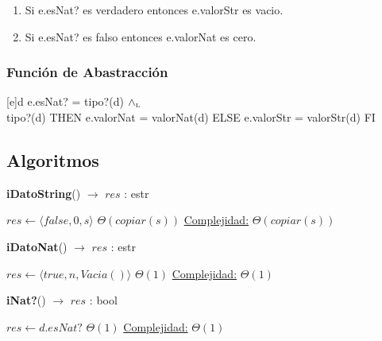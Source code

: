 \begin{enumerate}
	\item Si e.esNat? es verdadero entonces e.valorStr es vacio.
	\item Si e.esNat? es falso entonces e.valorNat es cero.

\end{enumerate}

\mbox{}


\subsubsection{Función de Abastracción}

[e]{d}{
	e.esNat? = tipo?(d) $\land_{\mathrm{\scriptscriptstyle{L}}}$ \\
	\IF tipo?(d) THEN e.valorNat = valorNat(d) ELSE e.valorStr = valorStr(d) FI
}


\subsection{Algoritmos}

  
\begin{algorithm}[H]{\textbf{iDatoString}() $\to$ $res$ : estr}
    	\begin{algorithmic}[1]
			 \State $res \gets \langle false, 0, s \rangle$ \Comment $\Theta(copiar(s))$
			\medskip
			\Statex \underline{Complejidad:} $\Theta(copiar(s))$
    	\end{algorithmic}
\end{algorithm}


  
\begin{algorithm}[H]{\textbf{iDatoNat}() $\to$ $res$ : estr}
    	\begin{algorithmic}[1]
			 \State $res \gets \langle true, n, Vacia() \rangle$ \Comment $\Theta(1)$
			\medskip
			\Statex \underline{Complejidad:} $\Theta(1)$
    	\end{algorithmic}
\end{algorithm}


\begin{algorithm}[H]{\textbf{iNat?}() $\to$ $res$ : bool}
    	\begin{algorithmic}[1]
			 \State $res \gets d.esNat? $ \Comment $\Theta(1)$
			\medskip
			\Statex \underline{Complejidad:} $\Theta(1)$
    	\end{algorithmic}
\end{algorithm}

